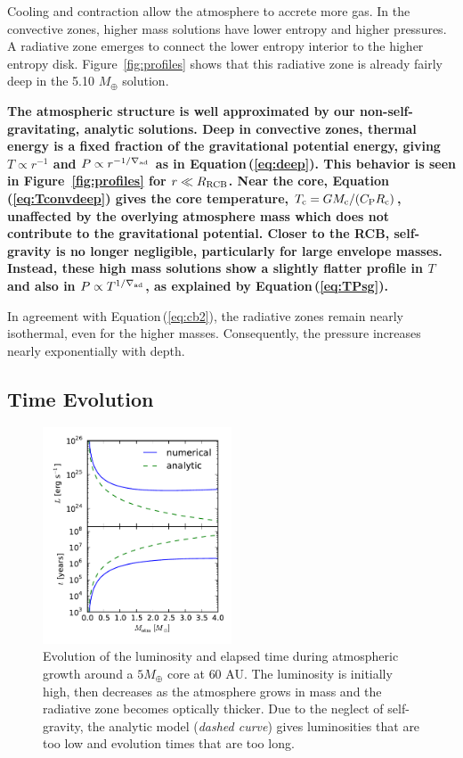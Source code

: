 \documentclass[apj, numberedappendix]{emulateapj}
\newcommand{\Eq}[1]{Equation\,(\ref{#1})}
\newcommand{\Fig}[1]{Figure~\ref{#1}}
\newcommand{\delad}{\nabla_{\rm ad}}
\newcommand{\co}{_{\rm c}}
\newcommand{\cb}{_{\rm RCB}}
\begin{document}
Cooling and contraction allow the atmosphere to accrete more gas.  In the convective zones, higher mass solutions have lower entropy and higher pressures.  A radiative zone emerges to connect the lower entropy interior to the higher entropy disk.  \Fig{fig:profiles} shows that this radiative zone is already fairly deep in the 5.10 $M_\oplus$ solution. 
 
\textbf{The atmospheric structure is well approximated by our non-self-gravitating, analytic solutions.  Deep in convective zones, thermal energy is a fixed fraction of the gravitational potential energy, giving $T \propto r^{-1}$ and $P\propto r^{-1/\delad}$  as in \Eq{eq:deep}.  This behavior is seen in \Fig{fig:profiles} for $r\ll R\cb$. Near the core, \Eq{eq:Tconvdeep} gives the core temperature, $T\co= G M\co / (C_{\rm P} R\co)$, unaffected by  the overlying atmosphere mass which does not contribute to the gravitational potential.  Closer to the RCB, self-gravity is no longer negligible, particularly for large envelope masses. Instead, these high mass solutions show a slightly flatter profile in $T$ and also in $P \propto T^{1/\delad}$, as explained by \Eq{eq:TPsg}.}

In agreement with \Eq{eq:cb2}, the radiative zones remain nearly isothermal, even for the higher masses.  Consequently, the pressure increases nearly exponentially with depth.  


\subsection{Time Evolution}\label{sec:timeev}

\begin{figure}[tb]
\centering
\includegraphics[width=0.5\textwidth]{Lt_profiles_v2.pdf}
\caption{Evolution of the luminosity and elapsed time during atmospheric growth around a $5 M_{\oplus}$ core at $60$ AU.  The luminosity is initially high, then decreases as the atmosphere grows in mass and the radiative zone becomes optically thicker.  Due to the neglect of self-gravity, the analytic model (\emph{dashed curve}) gives luminosities that are too low and evolution times that are too long.}
\label{fig:Ltplot}
\end{figure}
\end{document}
